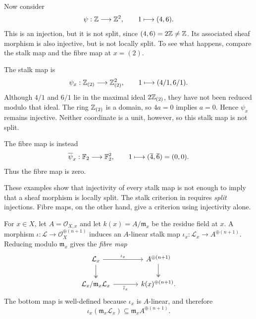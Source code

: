 \begin{example}\label{ex:lsi-46}
    Now consider
    \[
        \psi:\mathbb{Z}\longrightarrow\mathbb{Z}^2,
        \qquad 1\longmapsto(4,6).
    \]
    This is an injection, but it is not split, since
    \((4,6)=2\mathbb{Z}\ne\mathbb{Z}\). Its associated sheaf morphism is also injective,
    but is not locally split. To see what happens, compare the stalk
    map and the fibre map at \(x=(2)\).

    The stalk map is
    \[
        \psi_x:\mathbb{Z}_{(2)}\longrightarrow\mathbb{Z}_{(2)}^2,
        \qquad 1\longmapsto(4/1,6/1).
    \]
    Although \(4/1\) and \(6/1\) lie in the maximal ideal
    \(2\mathbb{Z}_{(2)}\), they have not been reduced modulo that ideal.
    The ring \(\mathbb{Z}_{(2)}\) is a domain, so \(4a=0\) implies \(a=0\).
    Hence \(\psi_x\) remains injective. Neither coordinate is a unit,
    however, so this stalk map is not split.

    The fibre map is instead
    \[
        \overline{\psi}_x:\mathbb{F}_2\longrightarrow\mathbb{F}_2^2,
        \qquad 1\longmapsto(\overline{4},\overline{6})=(0,0).
    \]
    Thus the fibre map is zero.
\end{example}

These examples show that injectivity of every stalk map is not enough
to imply that a sheaf morphism is locally split. The stalk criterion in
 requires \emph{split} injections. Fibre
maps, on the other hand, give a criterion using injectivity alone.

\begin{definition}\label{def:lsi-fibre-map}
    For \(x\in X\), let \(A=\mathcal{O}_{X,x}\) and let
    \(k(x)=A/\mathfrak{m}_x\) be the residue field at \(x\).
    A morphism \(\iota:\mathcal{L}\to\mathcal{O}_X^{\oplus(n+1)}\)
    induces an \(A\)-linear stalk map
    \(\iota_x:\mathcal{L}_x\to A^{\oplus(n+1)}\).
    Reducing modulo \(\mathfrak{m}_x\) gives the \emph{fibre map}
    \[
        \begin{tikzcd}[column sep=large]
            \mathcal{L}_x
            \arrow[r,"\iota_x"] \arrow[d,two heads]
            & A^{\oplus(n+1)} \arrow[d,two heads] \\
            \mathcal{L}_x/\mathfrak{m}_x\mathcal{L}_x
            \arrow[r,"\overline{\iota}_x"']
            & k(x)^{\oplus(n+1)}.
        \end{tikzcd}
    \]
    The bottom map is well-defined because \(\iota_x\) is \(A\)-linear,
    and therefore
    \[
        \iota_x(\mathfrak{m}_x\mathcal{L}_x)
        \subseteq\mathfrak{m}_x A^{\oplus(n+1)}.
    \]
\end{definition}

